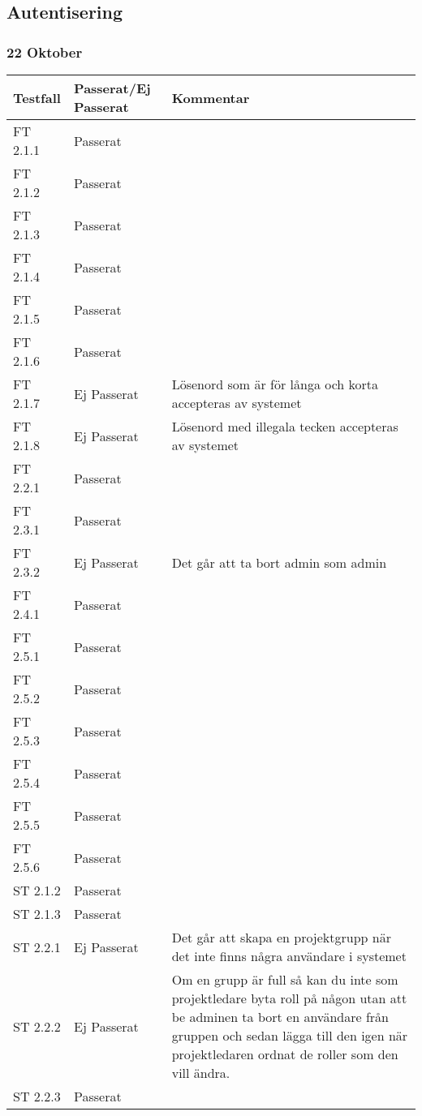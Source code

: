 \documentclass[a4paper]{article}
\begin{document}






\subsection{Autentisering}

\subsubsection{22 Oktober}
\begin{tabular}{| l | l | p{9cm} |}
\hline
Testfall &  Passerat/Ej Passerat & Kommentar\\
\hline
FT 2.1.1 & Passerat & \\
\hline
FT 2.1.2 & Passerat & \\
\hline
FT 2.1.3 & Passerat & \\
\hline
FT 2.1.4 & Passerat & \\
\hline
FT 2.1.5 & Passerat & \\
\hline
FT 2.1.6 & Passerat & \\
\hline
FT 2.1.7 & Ej Passerat & Lösenord som är för långa och korta accepteras av systemet \\
\hline
FT 2.1.8 & Ej Passerat & Lösenord med illegala tecken accepteras av systemet \\
\hline
FT 2.2.1 & Passerat & \\
\hline
FT 2.3.1 & Passerat & \\
\hline
FT 2.3.2 & Ej Passerat & Det går att ta bort admin som admin\\
\hline
FT 2.4.1 & Passerat & \\
\hline
FT 2.5.1 & Passerat & \\
\hline
FT 2.5.2 & Passerat & \\
\hline
FT 2.5.3 & Passerat & \\
\hline
FT 2.5.4 & Passerat & \\
\hline
FT 2.5.5 & Passerat & \\
\hline
FT 2.5.6 & Passerat & \\
\hline
ST 2.1.2 & Passerat & \\
\hline
ST 2.1.3 & Passerat & \\
\hline
ST 2.2.1 & Ej Passerat & Det går att skapa en projektgrupp när det inte finns några användare i systemet\\
\hline
ST 2.2.2 & Ej Passerat & Om en grupp är full så kan du inte som projektledare byta roll på någon utan att be adminen ta bort en användare från gruppen och sedan lägga till den igen när projektledaren ordnat de roller som den vill ändra.\\
\hline
ST 2.2.3 & Passerat & \\
\hline
\end{tabular}
\end{document}
